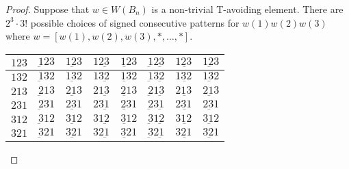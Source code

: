 \begin{proof}
Suppose that $w \in W(B_n)$ is a non-trivial T-avoiding element. There are $2^3 \cdot 3!$ possible choices of signed consecutive patterns for $w(1)w(2)w(3)$ where $w=[w(1), w(2), w(3), \ast, \ldots, \ast]$.

\begin{center}
\begin{tabular}{|l|l|l|l|l|l|l|l|}
\hline
\cellcolor{blue!30}$123$ & \cellcolor{orange2!40}$\underbar{1}23$ & \cellcolor{brown!50}$1\underbar{2}3$ & \cellcolor{red!25}$12\underbar{3}$ & \cellcolor{brown!50}$\underbar{12}3$ & \cellcolor{red!25}$\underbar{1}2\underbar{3}$ & \cellcolor{turq!40}$1\underbar{23}$ & \cellcolor{turq!40}$\underbar{123}$ \\
\hline
\cellcolor{blue!30}$132$ & \cellcolor{orange2!40}$\underbar{1}32$ & \cellcolor{brown!50}$1\underbar{3}2$ & \cellcolor{red!25}$13\underbar{2}$ & \cellcolor{brown!50}$\underbar{13}2$ & \cellcolor{red!25}$\underbar{1}3\underbar{2}$ & \cellcolor{ggreen!50}$1\underbar{32}$ & \cellcolor{ggreen!50}$\underbar{132}$ \\
\hline
\cellcolor{blue!30}$213$ & \cellcolor{yellow!50}$\underbar{2}13$ & \cellcolor{brown!50}$2\underbar{1}3$ & \cellcolor{turq!40}$21\underbar{3}$ & \cellcolor{yellow!50}$\underbar{21}3$ & \cellcolor{red!25}$\underbar{2}1\underbar{3}$ & \cellcolor{turq!40}$2\underbar{13}$ & \cellcolor{red!25}$\underbar{213}$ \\
\hline
\cellcolor{red!25}$231$ & \cellcolor{purple2!50}$\underbar{2}31$ & \cellcolor{ggreen!50}$2\underbar{3}1$ & \cellcolor{red!25}$23\underbar{1}$ & \cellcolor{brown!50}$\underbar{23}1$ & \cellcolor{purple2!50}$\underbar{2}3\underbar{1}$ & \cellcolor{ggreen!50}$2\underbar{31}$ & \cellcolor{brown!50}$\underbar{231}$ \\
\hline
\cellcolor{ggreen!50}$312$ & \cellcolor{yellow!50}$\underbar{3}12$ & \cellcolor{ggreen!50}$3\underbar{1}2$ &\cellcolor{turq!40}$31\underbar{2}$ & \cellcolor{yellow!50}$\underbar{31}2$ & \cellcolor{yellow!50}$\underbar{3}1\underbar{2}$ & \cellcolor{turq!40}$3\underbar{12}$ & \cellcolor{yellow!50}$\underbar{312}$ \\
\hline
\cellcolor{turq!40}$321$ & \cellcolor{yellow!50}$\underbar{3}21$ & \cellcolor{ggreen!50}$3\underbar{2}1$ & \cellcolor{turq!40}$32\underbar{1}$ & \cellcolor{yellow!50}$\underbar{32}1$ & \cellcolor{yellow!50}$\underbar{3}2\underbar{1}$ & \cellcolor{ggreen!50}$3\underbar{21}$ & \cellcolor{yellow!50}$\underbar{321}$\\
\hline
\end{tabular}
\end{center}


\end{proof}
